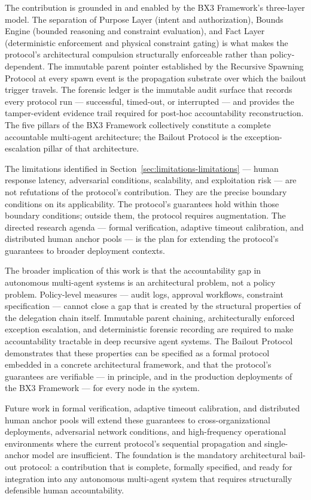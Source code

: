 The contribution is grounded in and enabled by the BX3 Framework's three-layer model. The separation of Purpose Layer (intent and authorization), Bounds Engine (bounded reasoning and constraint evaluation), and Fact Layer (deterministic enforcement and physical constraint gating) is what makes the protocol's architectural compulsion structurally enforceable rather than policy-dependent. The immutable parent pointer established by the Recursive Spawning Protocol at every spawn event is the propagation substrate over which the bailout trigger travels. The forensic ledger is the immutable audit surface that records every protocol run — successful, timed-out, or interrupted — and provides the tamper-evident evidence trail required for post-hoc accountability reconstruction. The five pillars of the BX3 Framework collectively constitute a complete accountable multi-agent architecture; the Bailout Protocol is the exception-escalation pillar of that architecture.

The limitations identified in Section~\ref{sec:limitations-limitations} — human response latency, adversarial conditions, scalability, and exploitation risk — are not refutations of the protocol's contribution. They are the precise boundary conditions on its applicability. The protocol's guarantees hold within those boundary conditions; outside them, the protocol requires augmentation. The directed research agenda — formal verification, adaptive timeout calibration, and distributed human anchor pools — is the plan for extending the protocol's guarantees to broader deployment contexts.

The broader implication of this work is that the accountability gap in autonomous multi-agent systems is an architectural problem, not a policy problem. Policy-level measures — audit logs, approval workflows, constraint specification — cannot close a gap that is created by the structural properties of the delegation chain itself. Immutable parent chaining, architecturally enforced exception escalation, and deterministic forensic recording are required to make accountability tractable in deep recursive agent systems. The Bailout Protocol demonstrates that these properties can be specified as a formal protocol embedded in a concrete architectural framework, and that the protocol's guarantees are verifiable — in principle, and in the production deployments of the BX3 Framework — for every node in the system.

Future work in formal verification, adaptive timeout calibration, and distributed human anchor pools will extend these guarantees to cross-organizational deployments, adversarial network conditions, and high-frequency operational environments where the current protocol's sequential propagation and single-anchor model are insufficient. The foundation is the mandatory architectural bail-out protocol: a contribution that is complete, formally specified, and ready for integration into any autonomous multi-agent system that requires structurally defensible human accountability.
